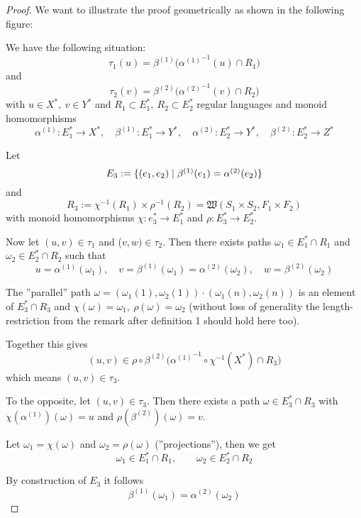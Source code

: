\begin{proof}
We want to illustrate the proof geometrically as shown in the following figure:

\begin{center}
\end{center}

We have the following situation:
\[ \tau_1(u) = \beta^{(1)}\big( {\alpha^{(1)}}^{-1}(u) \cap R_1 \big) \]
and
\[ \tau_2(v) = \beta^{(2)}\big( {\alpha^{(2)}}^{-1}(v) \cap R_2 \big) \]
with $u \in X^*,\ v \in Y^*$ and $R_1 \subset E_1^*,\ R_2 \subset E_2^*$ regular
languages and monoid homomorphisms
\[ \alpha^{(1)} : E_1^* \to X^*,\quad \beta^{(1)} : E_1^* \to
Y^*,\quad \alpha^{(2)} : E_2^* \to Y^*,\quad \beta^{(2)} : E_2^* \to Z^* \]

Let
\[ E_3 := \mbox{$\{(e_1, e_2) \mid \beta^{(1)}(e_1) = \alpha^{(2)}(e_2)\}$} \]
and 
\[ R_3 := \chi^{-1}(R_1) \times \rho^{-1}(R_2) = \mathfrak{W}(S_1 \times S_2,
F_1 \times F_2) \]
with monoid homomorphisms $\chi: e_3^* \to E_1^*$ and $\rho: E_3^* \to E_2^*$.

Now let $(u, v) \in \tau_1$ and ($v, w) \in \tau_2$. Then there exists paths
$\omega_1 \in E_1^* \cap R_1$ and $\omega_2 \in E_2^* \cap R_2$ such that 
\[ u = \alpha^{(1)}(\omega_1),\quad v = \beta^{(1)}(\omega_1) =
\alpha^{(2)}(\omega_2),\quad w = \beta^{(2)}(\omega_2) \]

The ''parallel'' path $\omega = (\omega_1(1), \omega_2(1)) \cdot
(\omega_1(n), \omega_2(n))$ is an element of $E_3^* \cap R_3$ and 
$\chi(\omega) = \omega_1,\ \rho(\omega) = \omega_2$ (without loss of
generality the length-restriction from the remark after definition 1 should
hold here too).

Together this gives
\[ (u, v) \in \rho \circ \beta^{(2)} \big( {\alpha^{(1)}}^{-1} \circ
\chi^{-1}(X^*) \cap R_3 \big) \]
which means $(u, v) \in \tau_3$.

\medskip
To the opposite, let $(u, v) \in \tau_3$. Then there exists a path $\omega \in
E_3^* \cap R_3$ with $\chi(\alpha^{(1)})(\omega) = u$ and $\rho(\beta^{(2)})(\omega)
= v$.

Let $\omega_1 = \chi(\omega)$ and $\omega_2 = \rho(\omega)$ (''projections''), then we get
\[ \omega_1 \in E_1^* \cap R_1,\qquad \omega_2 \in E_2^* \cap R_2 \]

By construction of $E_3$ it follows
\[ \beta^{(1)}(\omega_1) = \alpha^{(2)}(\omega_2) \]
\end{proof}


